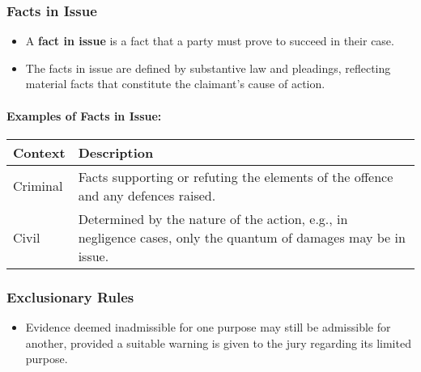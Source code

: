 \subsubsection{Facts in Issue}\label{facts-in-issue}

\begin{itemize}
\tightlist
\item
  A \textbf{fact in issue} is a fact that a party must prove to succeed
  in their case.
\item
  The facts in issue are defined by substantive law and pleadings,
  reflecting material facts that constitute the claimant's cause of
  action.
\end{itemize}

\paragraph{Examples of Facts in
Issue:}\label{examples-of-facts-in-issue}

\begin{longtable}[]{@{}
  >{\raggedright\arraybackslash}p{}
  >{\raggedright\arraybackslash}p{}@{}}
\toprule\noalign{}
\begin{minipage}[b]{\linewidth}\raggedright
Context
\end{minipage} & \begin{minipage}[b]{\linewidth}\raggedright
Description
\end{minipage} \\
\midrule\noalign{}
\endhead
\bottomrule\noalign{}
\endlastfoot
Criminal & Facts supporting or refuting the elements of the offence and
any defences raised. \\
Civil & Determined by the nature of the action, e.g., in negligence
cases, only the quantum of damages may be in issue. \\
\end{longtable}

\subsubsection{Exclusionary Rules}\label{exclusionary-rules}

\begin{itemize}
\tightlist
\item
  Evidence deemed inadmissible for one purpose may still be admissible
  for another, provided a suitable warning is given to the jury
  regarding its limited purpose.
\end{itemize}

